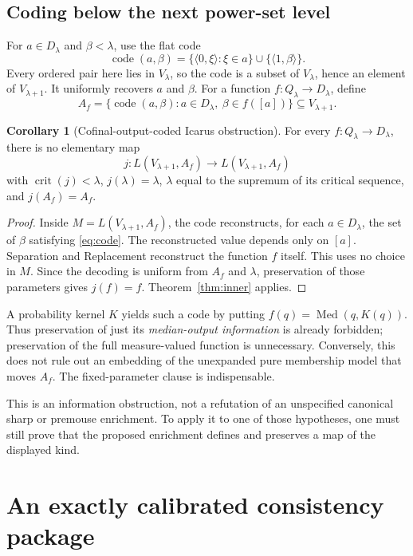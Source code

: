 \documentclass[11pt,letterpaper]{article}
\theoremstyle{definition}
\newtheorem{corollary}[definition]{Corollary}
\numberwithin{equation}{section}
\newcommand{\crit}{\operatorname{crit}}
\newcommand{\Med}{\operatorname{Med}}
\begin{document}
\subsection{Coding below the next power-set level}

For $a\in D_\lambda$ and $\beta<\lambda$, use the flat code
\[
 \operatorname{code}(a,\beta)
 =\{\langle0,\xi\rangle:\xi\in a\}\cup\{\langle1,\beta\rangle\}.
\]
Every ordered pair here lies in $V_\lambda$, so the code is a subset of $V_\lambda$, hence an element of $V_{\lambda+1}$. It uniformly recovers $a$ and $\beta$. For a function $f:Q_\lambda\to D_\lambda$, define
\begin{equation}\label{eq:code}
 A_f=\{\operatorname{code}(a,\beta):a\in D_\lambda,\ \beta\in f([a])\}
 \subseteq V_{\lambda+1}.
\end{equation}

\begin{corollary}[Cofinal-output-coded Icarus obstruction]\label{cor:icarus}
For every $f:Q_\lambda\to D_\lambda$, there is no elementary map
\[
 j:L(V_{\lambda+1},A_f)\longrightarrow L(V_{\lambda+1},A_f)
\]
with $\crit(j)<\lambda$, $j(\lambda)=\lambda$, $\lambda$ equal to the supremum of its critical sequence, and $j(A_f)=A_f$.
\end{corollary}
\begin{proof}
Inside $M=L(V_{\lambda+1},A_f)$, the code reconstructs, for each $a\in D_\lambda$, the set of $\beta$ satisfying \eqref{eq:code}. The reconstructed value depends only on $[a]$. Separation and Replacement reconstruct the function $f$ itself. This uses no choice in $M$. Since the decoding is uniform from $A_f$ and $\lambda$, preservation of those parameters gives $j(f)=f$. Theorem~\ref{thm:inner} applies.
\end{proof}

A probability kernel $K$ yields such a code by putting $f(q)=\Med(q,K(q))$. Thus preservation of just its \emph{median-output information} is already forbidden; preservation of the full measure-valued function is unnecessary. Conversely, this does not rule out an embedding of the unexpanded pure membership model that moves $A_f$. The fixed-parameter clause is indispensable.

This is an information obstruction, not a refutation of an unspecified canonical sharp or premouse enrichment. To apply it to one of those hypotheses, one must still prove that the proposed enrichment defines and preserves a map of the displayed kind.

\section{An exactly calibrated consistency package}\label{sec:consistency}
\end{document}
